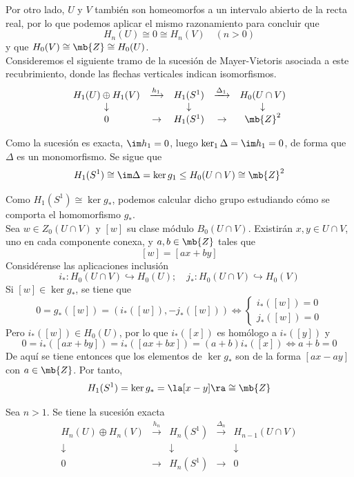 Por otro lado, $U$ y $V$ también son homeomorfos a un intervalo abierto de la recta real, por lo que podemos aplicar el mismo razonamiento para concluir que $$H_n(U) \cong 0 \cong H_n(V)\quad (n > 0)$$ y que $H_0(V) \cong \mb{Z} \cong H_0(U)$.
\\

Consideremos el siguiente tramo de la sucesión de Mayer-Vietoris asociada a este recubrimiento, donde las flechas verticales indican isomorfismos.
\[\begin{array}{ccccc}
H_1(U)\oplus H_1(V)	&\xrightarrow{h_1}	&H_1(S^1)		&\xrightarrow{\Delta_1}&H_0(U \cap V)\\
\downarrow			&					&\downarrow	&					&\downarrow\\
0			&\rightarrow			&H_1(S^1)		&\rightarrow			&\mb{Z}^2
\end{array}\]

Como la sucesión es exacta, $\im h_1=0$, luego $\ker_1 \Delta = \im h_1=0$, de forma que $\Delta$ es un monomorfismo. Se sigue que $$H_1(S^1)\cong \im \Delta = \ker g_1 \leq H_0(U\cap V)\cong \mb{Z}^2$$

Como $H_1(S^1) \cong \ker g_*$, podemos calcular dicho grupo estudiando cómo se comporta el homomorfismo $g_*$.
\\

Sea $w \in Z_0(U \cap V)$ y $[w]$ su clase módulo $B_0(U \cap V)$. Existirán $x,y \in U \cap V$, uno en cada componente conexa, y $a,b \in \mb{Z}$ tales que $$[w]=[ax+by]$$ Considérense las aplicaciones inclusión $$i_*: H_0(U \cap V) \hookrightarrow H_0(U); \quad j_*: H_0(U \cap V) \hookrightarrow H_0(V)$$ Si $[w] \in \ker g_*$, se tiene que
$$0=g_*([w])=(i_*([w]),-j_*([w])) \iff
\begin{cases}
i_*([w])=0\\
j_*([w])=0
\end{cases}$$
Pero $i_*([w]) \in H_0(U)$, por lo que $i_*([x])$ es homólogo a $i_*([y])$ y $$0=i_*([ax+by])=i_*([ax+bx])=(a+b)i_*([x]) \iff a+b=0$$ De aquí se tiene entonces que los elementos de $\ker g_*$ son de la forma $[ax-ay]$ con $a \in \mb{Z}$. Por tanto, $$H_1(S^1) =\ker g_*=\la[x-y]\ra \cong \mb{Z}$$

Sea $n > 1$. Se tiene la sucesión exacta
\[\begin{array}{ccccc}
H_n(U)\oplus H_n(V)	&\xrightarrow{h_n}	&H_n(S^1)		&\xrightarrow{\Delta_n}&H_{n-1}(U \cap V)\\
\downarrow	&					&\downarrow&&\downarrow\\
0			&\rightarrow			&H_n(S^1)		&\rightarrow			&0
\end{array}\]


